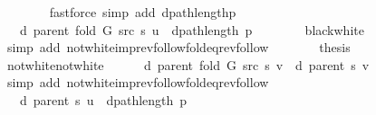 \begin{isabellebody}
\ \ \ \ \ \ \isamarkupfalse%
\ {\isacharparenleft}{\kern0pt}fastforce\ simp\ add{\isacharcolon}{\kern0pt}\ dpath{\isacharunderscore}{\kern0pt}length{\isacharunderscore}{\kern0pt}p{\isacharparenright}{\kern0pt}\isanewline
\ \ \ \ \isamarkupfalse%
\ \isamarkupfalse%
\ {\isachardoublequoteopen}{\isachardot}{\kern0pt}{\isachardot}{\kern0pt}{\isachardot}{\kern0pt}\ {\isacharequal}{\kern0pt}\ d\ {\isacharparenleft}{\kern0pt}parent\ {\isacharparenleft}{\kern0pt}fold\ G\ src\ s{\isacharparenright}{\kern0pt}{\isacharparenright}{\kern0pt}\ u\ {\isacharplus}{\kern0pt}\ dpath{\isacharunderscore}{\kern0pt}length\ p{\isachardoublequoteclose}\isanewline
\ \ \ \ \ \ \isamarkupfalse%
\ black{\isacharunderscore}{\kern0pt}white\isanewline
\ \ \ \ \ \ \isamarkupfalse%
\ {\isacharparenleft}{\kern0pt}simp\ add{\isacharcolon}{\kern0pt}\ not{\isacharunderscore}{\kern0pt}white{\isacharunderscore}{\kern0pt}imp{\isacharunderscore}{\kern0pt}rev{\isacharunderscore}{\kern0pt}follow{\isacharunderscore}{\kern0pt}fold{\isacharunderscore}{\kern0pt}eq{\isacharunderscore}{\kern0pt}rev{\isacharunderscore}{\kern0pt}follow{\isacharparenright}{\kern0pt}\isanewline
\ \ \ \ \isamarkupfalse%
\ \isamarkupfalse%
\ {\isacharquery}{\kern0pt}thesis\isanewline
\ \ \ \ \ \ \isacommand{{\isachardot}{\kern0pt}}\isamarkupfalse%
\isanewline
\ \ \isamarkupfalse%
\isanewline
\ \ \ \ \isamarkupfalse%
\ not{\isacharunderscore}{\kern0pt}white{\isacharunderscore}{\kern0pt}not{\isacharunderscore}{\kern0pt}white\isanewline
\ \ \ \ \isamarkupfalse%
\ {\isachardoublequoteopen}d\ {\isacharparenleft}{\kern0pt}parent\ {\isacharparenleft}{\kern0pt}fold\ G\ src\ s{\isacharparenright}{\kern0pt}{\isacharparenright}{\kern0pt}\ v\ {\isacharequal}{\kern0pt}\ d\ {\isacharparenleft}{\kern0pt}parent\ s{\isacharparenright}{\kern0pt}\ v{\isachardoublequoteclose}\isanewline
\ \ \ \ \ \ \isamarkupfalse%
\ {\isacharparenleft}{\kern0pt}simp\ add{\isacharcolon}{\kern0pt}\ not{\isacharunderscore}{\kern0pt}white{\isacharunderscore}{\kern0pt}imp{\isacharunderscore}{\kern0pt}rev{\isacharunderscore}{\kern0pt}follow{\isacharunderscore}{\kern0pt}fold{\isacharunderscore}{\kern0pt}eq{\isacharunderscore}{\kern0pt}rev{\isacharunderscore}{\kern0pt}follow{\isacharparenright}{\kern0pt}\isanewline
\ \ \ \ \isamarkupfalse%
\ \isamarkupfalse%
\ {\isachardoublequoteopen}{\isachardot}{\kern0pt}{\isachardot}{\kern0pt}{\isachardot}{\kern0pt}\ {\isasymle}\ d\ {\isacharparenleft}{\kern0pt}parent\ s{\isacharparenright}{\kern0pt}\ u\ {\isacharplus}{\kern0pt}\ dpath{\isacharunderscore}{\kern0pt}length\ p{\isachardoublequoteclose}\isanewline

\end{isabellebody}
